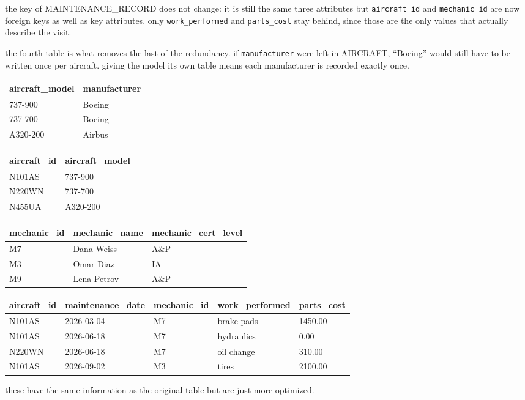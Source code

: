 \documentclass[12pt]{article}
\begin{document}
the key of MAINTENANCE\_RECORD does not change: it is still the same three
attributes but \texttt{aircraft\_id} and \texttt{mechanic\_id} are now
foreign keys as well as key attributes. only \texttt{work\_performed} and
\texttt{parts\_cost} stay behind, since those are the only values that actually
describe the visit.

the fourth table is what removes the last of the redundancy. if
\texttt{manufacturer} were left in AIRCRAFT, ``Boeing'' would still have to be written
once per aircraft. giving the model its own table means each manufacturer is
recorded exactly once.

\begin{table}[H]
\centering
\footnotesize
\begin{tabular}{|l|l|}
\hline
\textbf{aircraft\_model} & \textbf{manufacturer} \\
\hline
737-900 & Boeing \\
737-700 & Boeing \\
A320-200 & Airbus \\
\hline
\end{tabular}
\qquad
\begin{tabular}{|l|l|}
\hline
\textbf{aircraft\_id} & \textbf{aircraft\_model} \\
\hline
N101AS & 737-900 \\
N220WN & 737-700 \\
N455UA & A320-200 \\
\hline
\end{tabular}
\end{table}

\begin{table}[H]
\centering
\footnotesize
\begin{tabular}{|l|l|l|}
\hline
\textbf{mechanic\_id} & \textbf{mechanic\_name} & \textbf{mechanic\_cert\_level} \\
\hline
M7 & Dana Weiss & A\&P \\
M3 & Omar Diaz & IA \\
M9 & Lena Petrov & A\&P \\
\hline
\end{tabular}
\end{table}

\begin{table}[H]
\centering
\footnotesize
\begin{tabular}{|l|l|l|l|l|}
\hline
\textbf{aircraft\_id} & \textbf{maintenance\_date} & \textbf{mechanic\_id} &
\textbf{work\_performed} & \textbf{parts\_cost} \\
\hline
N101AS & 2026-03-04 & M7 & brake pads & 1450.00 \\
N101AS & 2026-06-18 & M7 & hydraulics & 0.00 \\
N220WN & 2026-06-18 & M7 & oil change & 310.00 \\
N101AS & 2026-09-02 & M3 & tires & 2100.00 \\
\hline
\end{tabular}
\end{table}

these have the same information as the original table but are just more optimized.
\end{document}
